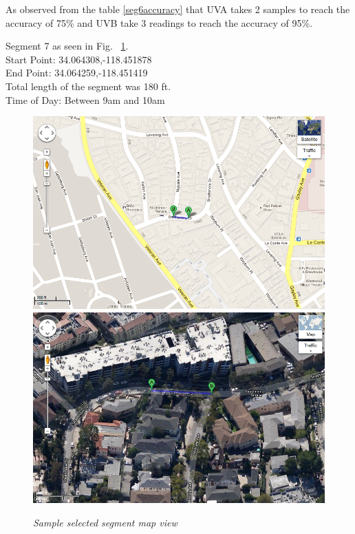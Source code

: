 \documentclass[12pt,fullpage,doublespace]{article}
\begin{document}
As observed from the table \ref{seg6accuracy} that UVA takes 2 samples to reach the accuracy of 75\% and UVB take 3 readings to reach the accuracy of 95\%. 
\newpage\newpage
\begin{center}
Segment 7 as seen in Fig. ~\ref{fig:segment7}. \\
Start Point:  34.064308,-118.451878\\
End Point:  34.064259,-118.451419\\
Total length of the segment was 180 ft.\\
Time of Day: Between 9am and 10am\\
\begin{figure}[h]
\begin{center}
\includegraphics[scale=0.32]{segment7a.png}
\includegraphics[scale=0.32]{segment7b.png}
\caption{\small \sl Sample selected segment map view}\label{fig:segment7}
\end{center}
\end{figure}
\end{center}
\end{document}

